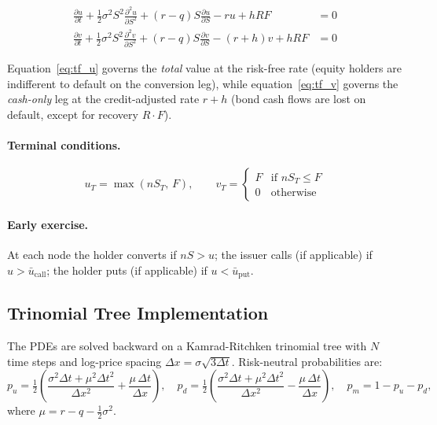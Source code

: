 \documentclass[11pt, a4paper]{article}
\begin{document}
\begin{align}
  \frac{\partial u}{\partial t} + \frac{1}{2}\sigma^2 S^2 \frac{\partial^2 u}{\partial S^2}
    + (r-q)S \frac{\partial u}{\partial S} - r u + hRF &= 0
  \label{eq:tf_u} \\[4pt]
  \frac{\partial v}{\partial t} + \frac{1}{2}\sigma^2 S^2 \frac{\partial^2 v}{\partial S^2}
    + (r-q)S \frac{\partial v}{\partial S} - (r+h) v + hRF &= 0
  \label{eq:tf_v}
\end{align}

Equation~\eqref{eq:tf_u} governs the \emph{total} value at the
risk-free rate (equity holders are indifferent to default on the
conversion leg), while equation~\eqref{eq:tf_v} governs the
\emph{cash-only} leg at the credit-adjusted rate $r+h$ (bond cash
flows are lost on default, except for recovery $R \cdot F$).

\paragraph{Terminal conditions.}
\begin{equation}
  u_T = \max(nS_T,\, F), \qquad
  v_T = \begin{cases} F & \text{if } nS_T \le F \\ 0 & \text{otherwise} \end{cases}
\end{equation}

\paragraph{Early exercise.}
At each node the holder converts if $nS > u$; the issuer calls (if
applicable) if $u > \bar{u}_{\text{call}}$; the holder puts (if
applicable) if $u < \bar{u}_{\text{put}}$.

\subsection{Trinomial Tree Implementation}

The PDEs are solved backward on a Kamrad-Ritchken trinomial tree
with $N$ time steps and log-price spacing $\Delta x = \sigma\sqrt{3\Delta t}$.
Risk-neutral probabilities are:
\begin{equation}
  p_u = \tfrac{1}{2}\!\left(\frac{\sigma^2 \Delta t + \mu^2 \Delta t^2}{\Delta x^2}
        + \frac{\mu\,\Delta t}{\Delta x}\right), \quad
  p_d = \tfrac{1}{2}\!\left(\frac{\sigma^2 \Delta t + \mu^2 \Delta t^2}{\Delta x^2}
        - \frac{\mu\,\Delta t}{\Delta x}\right), \quad
  p_m = 1 - p_u - p_d,
\end{equation}
where $\mu = r - q - \tfrac{1}{2}\sigma^2$.
\end{document}
